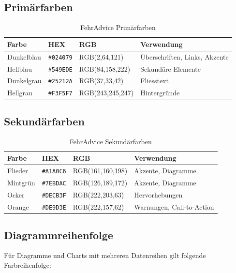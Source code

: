 \subsection{Primärfarben}

\begin{table}[h]
\centering
\caption{FehrAdvice Primärfarben}
\label{tab:primary-colors}
\begin{tabular}{llll}
\toprule
\textbf{Farbe} & \textbf{HEX} & \textbf{RGB} & \textbf{Verwendung} \\
\midrule
Dunkelblau & \texttt{\#024079} & RGB(2,64,121) & Überschriften, Links, Akzente \\
Hellblau & \texttt{\#549EDE} & RGB(84,158,222) & Sekundäre Elemente \\
Dunkelgrau & \texttt{\#25212A} & RGB(37,33,42) & Fliesstext \\
Hellgrau & \texttt{\#F3F5F7} & RGB(243,245,247) & Hintergründe \\
\bottomrule
\end{tabular}
\end{table}

\subsection{Sekundärfarben}

\begin{table}[h]
\centering
\caption{FehrAdvice Sekundärfarben}
\label{tab:secondary-colors}
\begin{tabular}{llll}
\toprule
\textbf{Farbe} & \textbf{HEX} & \textbf{RGB} & \textbf{Verwendung} \\
\midrule
Flieder & \texttt{\#A1A0C6} & RGB(161,160,198) & Akzente, Diagramme \\
Mintgrün & \texttt{\#7EBDAC} & RGB(126,189,172) & Akzente, Diagramme \\
Ocker & \texttt{\#DECB3F} & RGB(222,203,63) & Hervorhebungen \\
Orange & \texttt{\#DE9D3E} & RGB(222,157,62) & Warnungen, Call-to-Action \\
\bottomrule
\end{tabular}
\end{table}

\subsection{Diagrammreihenfolge}

Für Diagramme und Charts mit mehreren Datenreihen gilt folgende Farbreihenfolge:

